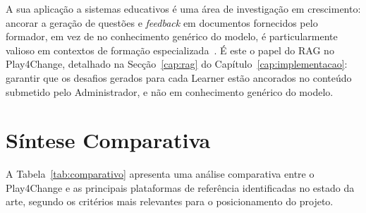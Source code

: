 A sua aplicação a sistemas educativos é uma área de investigação em crescimento: ancorar a geração de questões e \textit{feedback} em documentos fornecidos pelo formador, em vez de no conhecimento genérico do modelo, é particularmente valioso em contextos de formação especializada~\cite{kasneci2023}. É este o papel do RAG no Play4Change, detalhado na Secção~\ref{cap:rag} do Capítulo~\ref{cap:implementacao}: garantir que os desafios gerados para cada Learner estão ancorados no conteúdo submetido pelo Administrador, e não em conhecimento genérico do modelo.

\section{Síntese Comparativa} \label{sec:sintese}

A Tabela~\ref{tab:comparativo} apresenta uma análise comparativa entre o Play4Change e as principais plataformas de referência identificadas no estado da arte, segundo os critérios mais relevantes para o posicionamento do projeto.

\begin{table}[h!]
\centering
\caption{Comparação entre o Play4Change e plataformas de referência}
\label{tab:comparativo}
\end{table}

